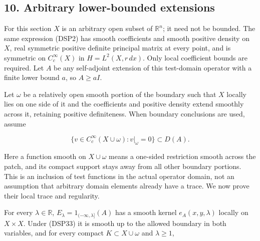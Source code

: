 \documentclass[
  11pt,
]{article}
\makeatletter
\let\ReaderOriginalAnchorStart\hyper@anchorstart
\let\ReaderOriginalAnchorEnd\hyper@anchorend
\let\ReaderPendingAliases\@empty
\def\ReaderArmAliases#1{\gdef\ReaderPendingAliases{#1}}
\def\hyper@anchorstart#1{\ReaderIfNativeAnchorTF{#1}{\ReaderPendingAliases\global\let\ReaderPendingAliases\@empty}{}\ReaderOriginalAnchorStart{#1}}
\makeatother
\begin{document}
\ReaderArmAliases{\ReaderOriginalAnchorStart{AN03-DSP-010}\ReaderOriginalAnchorEnd\begingroup\expandafter\def\csname @currentHref\endcsname{AN03-DSP-010}\label{AN03-DSP-010}\endgroup\ReaderOriginalAnchorStart{an03-dsp-010-arbitrary-lower-bounded-extensions}\ReaderOriginalAnchorEnd\begingroup\expandafter\def\csname @currentHref\endcsname{an03-dsp-010-arbitrary-lower-bounded-extensions}\label{an03-dsp-010-arbitrary-lower-bounded-extensions}\endgroup\ReaderOriginalAnchorStart{10-arbitrary-lower-bounded-extensions}\ReaderOriginalAnchorEnd\begingroup\expandafter\def\csname @currentHref\endcsname{10-arbitrary-lower-bounded-extensions}\label{10-arbitrary-lower-bounded-extensions}\endgroup\ReaderOriginalAnchorStart{arbitrary-lower-bounded-extensions}\ReaderOriginalAnchorEnd}
\subsection{10. Arbitrary lower-bounded
extensions}\label{arbitrary-lower-bounded-extensions}

For this section \(X\) is an arbitrary open subset of \(\mathbb R^n\);
it need not be bounded. The same expression (DSP2) has smooth
coefficients and smooth positive density on \(X\), real symmetric
positive definite principal matrix at every point, and is symmetric on
\(C_c^\infty(X)\) in \(H=L^2(X,r\,dx)\). Only local coefficient bounds
are required. Let \(A\) be any self-adjoint extension of this
test-domain operator with a finite lower bound \(a\), so \(A\geq aI\).

Let \(\omega\) be a relatively open smooth portion of the boundary such
that \(X\) locally lies on one side of it and the coefficients and
positive density extend smoothly across it, retaining positive
definiteness. When boundary conclusions are used, assume

\[
 \{v\in C_c^\infty(X\cup\omega):v|_\omega=0\}\subset D(A).
 \tag{DSP33}
\]

Here a function smooth on \(X\cup\omega\) means a one-sided restriction
smooth across the patch, and its compact support stays away from all
other boundary portions. This is an inclusion of test functions in the
actual operator domain, not an assumption that arbitrary domain elements
already have a trace. We now prove their local trace and regularity.

For every \(\lambda\in\mathbb R\),
\(E_\lambda=1_{(-\infty,\lambda]}(A)\) has a smooth kernel
\(e_A(x,y,\lambda)\) locally on \(X\times X\). Under (DSP33) it is
smooth up to the allowed boundary in both variables, and for every
compact \(K\subset X\cup\omega\) and \(\lambda\geq1\),
\end{document}
